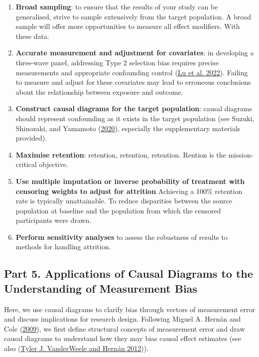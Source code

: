 \documentclass[
  singlecolumn]{article}
\begin{document}
\begin{enumerate}
\def\labelenumi{\arabic{enumi}.}
\item
  \textbf{Broad sampling}: to ensure that the results of your study can
  be generalised, strive to sample extensively from the target
  population. A broad sample will offer more opportunities to measure
  all effect modifiers. With these data.
\item
  \textbf{Accurate measurement and adjustment for covariates}: in
  developing a three-wave panel, addressing Type 2 selection bias
  requires precise measurements and appropriate confounding control
  (\protect\hyperlink{ref-lu2022}{Lu et al. 2022}). Failing to measure
  and adjust for these covariates may lead to erroneous conclusions
  about the relationship between exposure and outcome.
\item
  \textbf{Construct causal diagrams for the target population}: causal
  diagrams should represent confounding as it exists in the target
  population (see Suzuki, Shinozaki, and Yamamoto
  (\protect\hyperlink{ref-suzuki2020}{2020}), especially the
  supplementary materials provided).
\item
  \textbf{Maximise retention}: retention, retention, retention. Rention
  is the mission-critical objective.
\item
  \textbf{Use multiple imputation or inverse probability of treatment
  with censoring weights to adjust for attrition} Achieving a 100\%
  retention rate is typically unattainable. To reduce disparities
  between the source population at baseline and the population from
  which the censored participants were drawn.
\item
  \textbf{Perform sensitivity analyses} to assess the robustness of
  results to methods for handling attrition.
\end{enumerate}

\hypertarget{part-5.-applications-of-causal-diagrams-to-the-understanding-of-measurement-bias}{%
\subsection{Part 5. Applications of Causal Diagrams to the Understanding
of Measurement
Bias}\label{part-5.-applications-of-causal-diagrams-to-the-understanding-of-measurement-bias}}

Here, we use causal diagrams to clarify bias through vectors of
measurement error and discuss implications for research design.
Following Miguel A. Hernán and Cole
(\protect\hyperlink{ref-hernuxe1n2009}{2009}), we first define
structural concepts of measurement error and draw causal diagrams to
understand how they may bias causal effect estimates (see also
(\protect\hyperlink{ref-vanderweele2012}{Tyler J. VanderWeele and Hernán
2012})).
\end{document}
